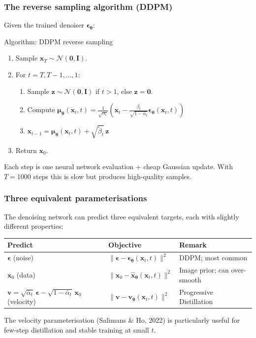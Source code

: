 \documentclass{beamer}
\newcommand{\Norm}{\mathcal{N}}
\begin{document}
\begin{frame}
\frametitle{The reverse sampling algorithm (DDPM)}

Given the trained denoiser $\bm{\epsilon}_{\bm{\theta}}$:

\begin{block}{Algorithm: DDPM reverse sampling}
\begin{enumerate}
  \item Sample $\bm{x}_T\sim\Norm(\bm{0},\mathbf{I})$.
  \item For $t = T, T-1, \ldots, 1$:
    \begin{enumerate}
      \item Sample $\bm{z}\sim\Norm(\bm{0},\mathbf{I})$ if $t>1$, else $\bm{z}=\bm{0}$.
      \item Compute $\bm{\mu}_{\bm{\theta}}(\bm{x}_t,t) =
            \frac{1}{\sqrt{\alpha_t}}\!\left(\bm{x}_t
            - \frac{\beta_t}{\sqrt{1-\bar\alpha_t}}
              \bm{\epsilon}_{\bm{\theta}}(\bm{x}_t,t)\right)$
      \item $\bm{x}_{t-1} = \bm{\mu}_{\bm{\theta}}(\bm{x}_t,t)
            + \sqrt{\tilde\beta_t}\,\bm{z}$
    \end{enumerate}
  \item Return $\bm{x}_0$.
\end{enumerate}
\end{block}

Each step is one neural network evaluation + cheap Gaussian update.
With $T=1000$ steps this is slow but produces high-quality samples.
\end{frame}

\begin{frame}
\frametitle{Three equivalent parameterisations}

The denoising network can predict three equivalent targets, each with
slightly different properties:

\begin{block}{}
\begin{center}
\begin{tabular}{lll}
\toprule
\textbf{Predict} & \textbf{Objective} & \textbf{Remark} \\
\midrule
$\bm{\epsilon}$ (noise) &
  $\|\bm{\epsilon} - \bm{\epsilon}_{\bm{\theta}}(\bm{x}_t,t)\|^2$ &
  DDPM; most common \\[4pt]
$\bm{x}_0$ (data) &
  $\|\bm{x}_0 - \hat{\bm{x}}_{\bm{\theta}}(\bm{x}_t,t)\|^2$ &
  Image prior; can over-smooth \\[4pt]
$\bm{v} = \sqrt{\bar\alpha_t}\,\bm{\epsilon}
  - \sqrt{1-\bar\alpha_t}\,\bm{x}_0$ (velocity) &
  $\|\bm{v} - \bm{v}_{\bm{\theta}}(\bm{x}_t,t)\|^2$ &
  Progressive Distillation \\
\bottomrule
\end{tabular}
\end{center}
\end{block}

The velocity parameterisation (Salimans \& Ho, 2022) is particularly
useful for few-step distillation and stable training at small $t$.
\end{frame}
\end{document}

